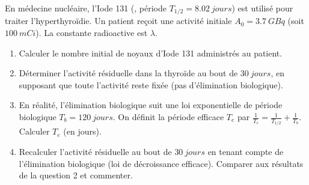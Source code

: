 \documentclass[11pt]{article}
\begin{document}
\begin{exercice}
En médecine nucléaire, l'Iode 131 (, période $T_{1/2} = \SI{8.02}{jours}$) est utilisé pour traiter l'hyperthyroïdie. Un patient reçoit une activité initiale $A_0 = \SI{3.7}{GBq}$ (soit $\SI{100}{mCi}$). La constante radioactive est $\lambda$.
\begin{enumerate}
    \item Calculer le nombre initial de noyaux d'Iode 131 administrés au patient.
    \item Déterminer l'activité résiduelle dans la thyroïde au bout de $\SI{30}{jours}$, en supposant que toute l'activité reste fixée (pas d'élimination biologique).
    \item En réalité, l'élimination biologique suit une loi exponentielle de période biologique $T_b = \SI{120}{jours}$. On définit la période efficace $T_e$ par $\frac{1}{T_e} = \frac{1}{T_{1/2}} + \frac{1}{T_b}$. Calculer $T_e$ (en jours).
    \item Recalculer l'activité résiduelle au bout de $\SI{30}{jours}$ en tenant compte de l'élimination biologique (loi de décroissance efficace). Comparer aux résultats de la question 2 et commenter.
\end{enumerate}
\end{exercice}
\end{document}
